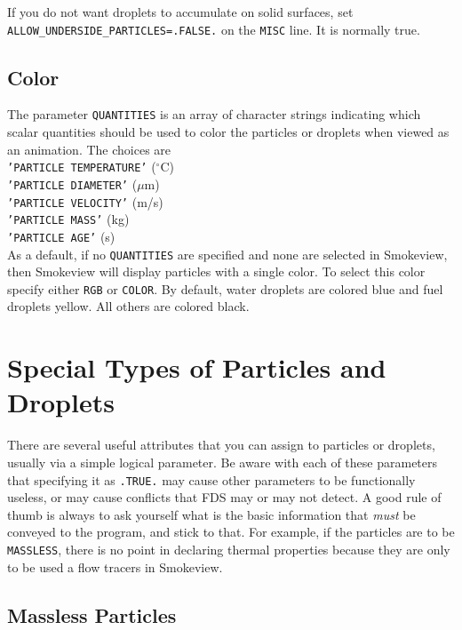 \documentclass[11pt]{book}
\newcommand{\ct}{\tt\small}
\begin{document}
\begin{warning}
\noindent If you do not want droplets to accumulate on solid surfaces, set {\ct ALLOW\_UNDERSIDE\_PARTICLES=.FALSE.} on the
{\ct MISC} line. It is normally true.
\end{warning}



\subsection{Color}
\label{info:particle_quantities}

The parameter {\ct QUANTITIES} is an array of character strings indicating which
scalar quantities should be used to color the particles or droplets when viewed as an
animation. The choices are \\
{\ct 'PARTICLE TEMPERATURE'} ($^\circ$C) \\
{\ct 'PARTICLE DIAMETER'} ($\mu$m) \\
{\ct 'PARTICLE VELOCITY'} (m/s) \\
{\ct 'PARTICLE MASS'} (kg) \\
{\ct 'PARTICLE AGE'} (s) \\
As a default, if no {\ct QUANTITIES} are specified and none are selected in Smokeview, then
Smokeview will display particles with a single color.  To select this color specify either {\ct RGB} or
{\ct COLOR}. By default, water droplets are colored blue and fuel droplets yellow. All others are colored black.



\clearpage

\section{Special Types of Particles and Droplets}
\label{part_type}

There are several useful attributes that you can assign to particles or droplets, usually via a simple logical parameter. Be aware with each of these parameters that
specifying it as {\ct .TRUE.} may cause other parameters to be functionally useless, or may cause conflicts that FDS may or may not detect. A good rule of thumb is always to
ask yourself what is the basic information that {\em must} be conveyed to the program, and stick to that. For example, if the particles are to be {\ct MASSLESS}, there is no
point in declaring thermal properties because they are only to be used a flow tracers in Smokeview.

\subsection{Massless Particles}
\label{info:MASSLESS}
\end{document}
